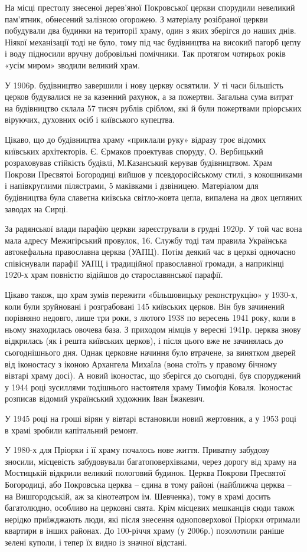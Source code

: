 На місці
престолу знесеної дерев’яної Покровської церкви спорудили невеликий
пам’ятник, обнесений залізною огорожею. З матеріалу розібраної церкви
побудували два будинки на території храму, один з яких зберігся до наших
днів. Ніякої механізації тоді не було, тому під час будівництва на високий
пагорб цеглу і воду підносили вручну добровільні помічники. Так протягом
чотирьох років «усім миром» зводили великий храм. 


У 1906р. будівництво завершили і нову церкву освятили. У ті часи більшість
церков будувалися не за казенний рахунок, а за пожертви. Загальна сума витрат
на будівництво склала 57 тисяч рублів сріблом, які й були пожертвами пріорських
віруючих, духовних осіб і київського купецтва. 

Цікаво, що до будівництва храму «приклали руку» відразу троє відомих київських
архітекторів. Є. Єрмаков проектував споруду, О. Вербицький розраховував
стійкість будівлі, М.Казанський керував будівництвом. Храм Покрови Пресвятої
Богородиці вийшов у псевдоросійському стилі, з кокошниками і напівкруглими
пілястрами, 5 маківками і дзвіницею. Матеріалом для будівництва була славетна
київська світло-жовта цегла, випалена на двох цегляних заводах на Сирці. 

За радянської влади парафію церкви зареєстрували в грудні 1920р. У той час вона
мала адресу Межигірський провулок, 16. Службу тоді там правила Українська
автокефальна православна церква (УАПЦ). Потім деякий час в церкві одночасно
співіснували парафії УАПЦ і традиційної православної громади, а наприкінці
1920-х храм повністю відійшов до старославянської парафії. 

Цікаво також, що храм зумів пережити «більшовицьку реконструкцію» у 1930-х,
коли були зруйновані і розграбовані 145 київських церков. Він був зачинений
порівняно недовго, лише три роки, з лютого 1938 по вересень 1941 року, коли в
ньому знаходилась овочева база. З приходом німців у вересні 1941р. церква знову
відкрилась (як і решта київських церков), і після цього вже не зачинялась до
сьогоднішнього дня. Однак церковне начиння було втрачене, за винятком дверей
від іконостасу з іконою Архангела Михаїла (вона стоїть у правому бічному
вівтарі храму досі). А новий іконостас, що зберігся до сьогодні, був
споруджений у 1944 році зусиллями тодішнього настоятеля храму Тимофія Коваля.
Іконостас розписав відомий український художник Іван Їжакевич.  

У 1945 році на гроші вірян у вівтарі встановили новий жертовник, а у 1953 році
в храмі зробили капітальний ремонт.

У 1980-х для Пріорки і її храму почалось нове життя. Приватну забудову зносили,
місцевість забудовували багатоповерхівками, через дорогу від храму на
Мостицькій відкрили великий пологовий будинок. Церква Покрови Пресвятої
Богородиці, або Покровська церква – єдина в тому районі (найближча церква – на
Вишгородській, аж за кінотеатром ім. Шевченка), тому в храмі досить багатолюдно,
особливо на церковні свята. Крім місцевих мешканців сюди також нерідко
приїжджають люди, які після знесення одноповерхової Пріорки отримали квартири в
інших районах. До 100-річчя храму (у 2006р.) позолотили раніше зелені куполи, і
тепер їх видно із значної відстані.
